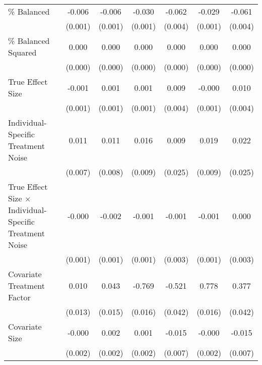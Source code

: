\begin{table}[htbp]
\begin{tabular}{l*{6}{c}}
\% Balanced         &      -0.006\sym{***}&      -0.006\sym{***}&      -0.030\sym{***}&      -0.062\sym{***}&      -0.029\sym{***}&      -0.061\sym{***}\\
                    &     (0.001)         &     (0.001)         &     (0.001)         &     (0.004)         &     (0.001)         &     (0.004)         \\
\% Balanced Squared &       0.000\sym{***}&       0.000\sym{***}&       0.000\sym{***}&       0.000\sym{***}&       0.000\sym{***}&       0.000\sym{***}\\
                    &     (0.000)         &     (0.000)         &     (0.000)         &     (0.000)         &     (0.000)         &     (0.000)         \\
True Effect Size    &      -0.001         &       0.001         &       0.001         &       0.009\sym{*}  &      -0.000         &       0.010\sym{*}  \\
                    &     (0.001)         &     (0.001)         &     (0.001)         &     (0.004)         &     (0.001)         &     (0.004)         \\
Individual-Specific Treatment Noise&       0.011         &       0.011         &       0.016         &       0.009         &       0.019\sym{*}  &       0.022         \\
                    &     (0.007)         &     (0.008)         &     (0.009)         &     (0.025)         &     (0.009)         &     (0.025)         \\
True Effect Size $\times$ Individual-Specific Treatment Noise&      -0.000         &      -0.002         &      -0.001         &      -0.001         &      -0.001         &       0.000         \\
                    &     (0.001)         &     (0.001)         &     (0.001)         &     (0.003)         &     (0.001)         &     (0.003)         \\
Covariate Treatment Factor&       0.010         &       0.043\sym{**} &      -0.769\sym{***}&      -0.521\sym{***}&       0.778\sym{***}&       0.377\sym{***}\\
                    &     (0.013)         &     (0.015)         &     (0.016)         &     (0.042)         &     (0.016)         &     (0.042)         \\
Covariate Size      &      -0.000         &       0.002         &       0.001         &      -0.015\sym{*}  &      -0.000         &      -0.015\sym{*}  \\
                    &     (0.002)         &     (0.002)         &     (0.002)         &     (0.007)         &     (0.002)         &     (0.007)         \\

\end{tabular}
\end{table}
